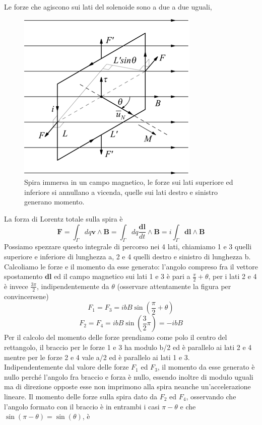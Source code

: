 \documentclass[
10pt, %
a4paper, %
oneside, %
headinclude,footinclude, %
BCOR5mm, %
]{scrartcl}
\begin{document}
Le forze che agiscono sui lati del solenoide sono a due a due uguali,
\begin{figure}[h!]
	\centering
	\includegraphics[width=0.5\linewidth]{../images/spira_campo_magnetico}
	\caption{Spira immersa in un campo magnetico, le forze sui lati superiore ed inferiore si annullano a vicenda, quelle sui lati destro e sinistro generano momento.}
	\label{fig:spiracampomagnetico}
\end{figure}
\FloatBarrier
La forza di Lorentz totale sulla spira è
\[\mathbf{F}= \int_{\Gamma}dq\mathbf{v}\wedge\mathbf{B}= \int_{\Gamma}dq\frac{\mathbf{dl}}{dt}\wedge\mathbf{B}= i \int_{\Gamma}\mathbf{dl}\wedge\mathbf{B}\]
Possiamo spezzare questo integrale di percorso nei 4 lati, chiamiamo 1 e 3 quelli superiore e inferiore di lunghezza a, 2 e 4 quelli destro e sinistro di lunghezza b.\\
Calcoliamo le forze e il momento da esse generato: l'angolo compreso fra il vettore spostamento $\mathbf{dl}$ ed il campo magnetico sui lati 1 e 3 è pari a \(\frac{\pi}{2}+\theta\), per i lati 2 e 4 è invece \(\frac{3\pi}{2}\), indipendentemente da $\theta$ (osservare attentamente la figura per convincersene)
\[F_1=F_3=ibB\sin(\frac{\pi}{2}+\theta)\]
\[F_2=F_4 = ibB\sin(\frac{3}{2}\pi)= -ibB\]
Per il calcolo del momento delle forze prendiamo come polo il centro del rettangolo, il braccio per le forze 1 e 3 ha modulo b/2 ed è parallelo ai lati 2 e 4 mentre per le forze 2 e 4 vale a/2 ed è parallelo ai lati 1 e 3.\\
Indipendentemente dal valore delle forze  \(F_1\) ed \(F_3\), il momento da esse generato è nullo perché l'angolo fra braccio e forza è nullo, essendo inoltre di modulo uguali ma di direzione opposte esse non imprimono alla spira neanche un'accelerazione lineare.
Il momento delle forze sulla spira dato da \(F_2\) ed \(F_4\), osservando che l'angolo formato con il braccio è in entrambi i casi $\pi - \theta$ e che \(\sin(\pi-\theta) = \sin(\theta)\), è
\end{document}
